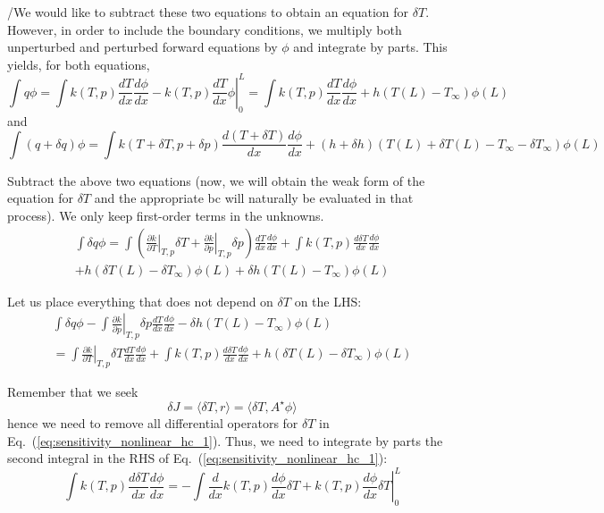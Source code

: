 \documentclass[11pt]{article}
\newcommand{\eqt}[1]{Eq.~(\ref{#1})}                     %
\begin{document}
/We would like to subtract these two equations to obtain an equation for $\delta T$. However, in order to include the boundary conditions, we multiply both unperturbed and perturbed forward equations by $\phi$ and integrate by parts. This yields, for both equations,
\begin{equation}
\int q\phi = \int k(T,p)\frac{dT}{dx}\frac{d\phi}{dx} - \left.k(T,p)\frac{dT}{dx}\phi\right|_0^L  
= \int k(T,p)\frac{dT}{dx}\frac{d\phi}{dx} +h(T(L)-T_\infty) \phi(L) 
\end{equation}
and
\begin{equation}
\int (q+\delta q)\phi = \int k(T+\delta T,p+\delta p)\frac{d(T+\delta T)}{dx}\frac{d\phi}{dx} +(h+\delta h)(T(L)+\delta T(L)-T_\infty-\delta T_\infty) \phi(L) 
\end{equation}

Subtract the above two equations (now, we will obtain the weak form of the equation for $\delta T$ and the appropriate bc will naturally be evaluated in that process). We only keep first-order terms in the unknowns.
\begin{multline}
\int \delta q\phi = \int \left(\left.\frac{\partial k}{\partial T}\right|_{T,p}\delta T+\left.\frac{\partial k}{\partial p}\right|_{T,p}\delta p\right) \frac{dT}{dx}\frac{d\phi}{dx} + \int k(T,p)\frac{d\delta T}{dx}\frac{d\phi}{dx} \\
+h(\delta T(L)-\delta T_\infty)  \phi(L)
+\delta h(T(L)-T_\infty)  \phi(L)
\end{multline}

Let us place everything that does not depend on $\delta T$ on the LHS:
\begin{multline}
\label{eq:sensitivity_nonlinear_hc_1}
\int \delta q\phi 
-\int \left.\frac{\partial k}{\partial p}\right|_{T,p}\delta p \frac{dT}{dx}\frac{d\phi}{dx} 
-\delta h(T(L)-T_\infty)  \phi(L)
\\=
\int \left.\frac{\partial k}{\partial T}\right|_{T,p}\delta T \frac{dT}{dx}\frac{d\phi}{dx} 
+ \int k(T,p)\frac{d\delta T}{dx}\frac{d\phi}{dx} 
+h(\delta T(L)-\delta T_\infty)  \phi(L)
\end{multline}

Remember that we seek 
\[
\delta J = \langle \delta T, r \rangle = \langle \delta T, A^\star \phi \rangle 
\]
hence we need to remove all differential operators for $\delta T$ in \eqt{eq:sensitivity_nonlinear_hc_1}. Thus, we need to integrate by parts the second integral in the RHS of \eqt{eq:sensitivity_nonlinear_hc_1}:
\[
\int k(T,p)\frac{d\delta T}{dx}\frac{d\phi}{dx} 
=
-\int \frac{d}{dx}k(T,p)\frac{d\phi}{dx} \delta T + \left.k(T,p)\frac{d\phi}{dx}\delta T\right|_0^L
\]
\end{document}
